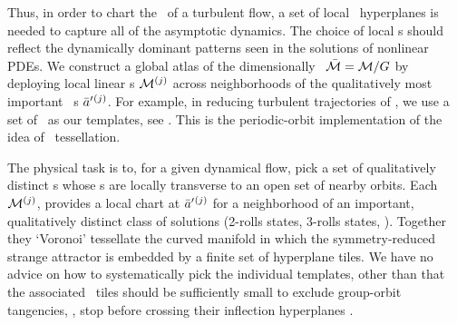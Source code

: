 \documentclass{jfm}
\begin{document}
Thus, in order to chart the \statesp\ of a turbulent flow, a set
of local \slice\ hyperplanes is needed to capture all of the asymptotic
dynamics. The choice of local \slice s should reflect the dynamically
dominant patterns seen in the solutions of nonlinear PDEs. We construct a
global atlas of the dimensionally \reducedsp\ $\pSRed = \pS/\Group$ by
deploying local linear \slice s  $\pS{}^{(j)}$ across neighborhoods of
the qualitatively most important \template\ {\cohStr s}
$\bar{a}'{}^{(j)}$. For example, in reducing turbulent trajectories of
, we use a set of \reqva\ as our templates, see
. This is the periodic-orbit implementation of the
idea of {\statesp\ tessellation}.

The physical task is to, for a given dynamical flow, pick a set of
qualitatively distinct {\template s} whose \slice s  are locally
transverse to an open set of nearby orbits. Each \slice\ $\pS{}^{(j)}$,
provides a local chart at $\bar{a}'{}^{(j)}$ for a neighborhood of an
important, qualitatively distinct class of solutions (2-rolls states,
3-rolls states, \etc). Together they `Voronoi' tessellate  the curved
manifold in which the symmetry-reduced strange attractor is embedded by a
finite set of hyperplane tiles. We have no advice on how to
systematically pick the individual templates, other than that the
associated \slice\ tiles should be sufficiently small to exclude
group-orbit tangencies, \ie, stop before crossing their inflection
hyperplanes .





\end{document}
